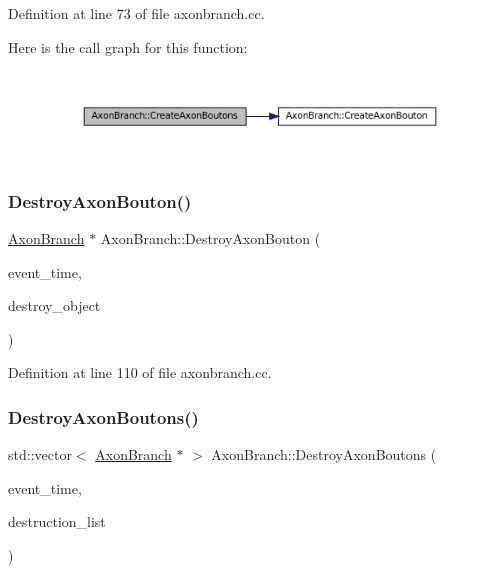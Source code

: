Definition at line 73 of file axonbranch.\+cc.

Here is the call graph for this function\+:\nopagebreak
\begin{figure}[H]
\begin{center}
\leavevmode
\includegraphics[width=350pt]{class_axon_branch_a77e93626a7993f76e689d09721974e90_cgraph}
\end{center}
\end{figure}
\mbox{\label{class_axon_branch_a024c8666555702ebe67e2a5caf1b866a}} 
\subsubsection{\texorpdfstring{Destroy\+Axon\+Bouton()}{DestroyAxonBouton()}}
{\footnotesize\ttfamily \mbox{\hyperlink{class_axon_branch}{Axon\+Branch}} $\ast$ Axon\+Branch\+::\+Destroy\+Axon\+Bouton (\begin{DoxyParamCaption}\item[{std\+::chrono\+::time\+\_\+point$<$ \mbox{\hyperlink{universe_8h_a0ef8d951d1ca5ab3cfaf7ab4c7a6fd80}{Clock}} $>$}]{event\+\_\+time,  }\item[{\mbox{\hyperlink{class_axon_branch}{Axon\+Branch}} $\ast$}]{destroy\+\_\+object }\end{DoxyParamCaption})}



Definition at line 110 of file axonbranch.\+cc.

\mbox{\label{class_axon_branch_a8c022977e091b8cab367b21c0c4930ea}} 
\subsubsection{\texorpdfstring{Destroy\+Axon\+Boutons()}{DestroyAxonBoutons()}}
{\footnotesize\ttfamily std\+::vector$<$ \mbox{\hyperlink{class_axon_branch}{Axon\+Branch}} $\ast$ $>$ Axon\+Branch\+::\+Destroy\+Axon\+Boutons (\begin{DoxyParamCaption}\item[{std\+::chrono\+::time\+\_\+point$<$ \mbox{\hyperlink{universe_8h_a0ef8d951d1ca5ab3cfaf7ab4c7a6fd80}{Clock}} $>$}]{event\+\_\+time,  }\item[{std\+::vector$<$ \mbox{\hyperlink{class_axon_branch}{Axon\+Branch}} $\ast$$>$}]{destruction\+\_\+list }\end{DoxyParamCaption})}




